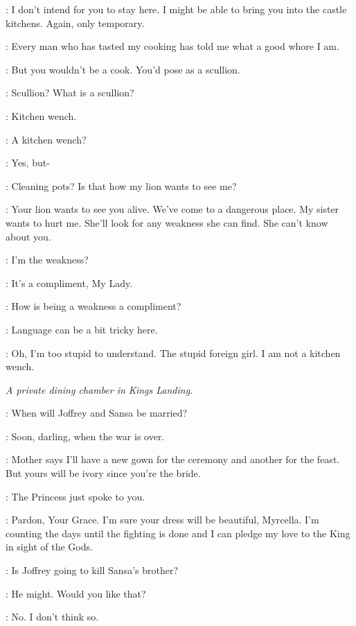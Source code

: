 \TYRION: I don't intend for you to stay here. I might be able to bring you into the castle kitchens. Again, only temporary. 

\SHAE: Every man who has tasted my cooking has told me what a good whore I am. 

\TYRION: But you wouldn't be a cook. You'd pose as a scullion. 

\SHAE: Scullion? What is a scullion? 

\TYRION: Kitchen wench. 

\SHAE: A kitchen wench? 

\TYRION: Yes, but- 

\SHAE: Cleaning pots? Is that how my lion wants to see me? 

\TYRION: Your lion wants to see you alive. We've come to a dangerous place. My sister wants to hurt me. She'll look for any weakness she can find. She can't know about you. 

\SHAE: I'm the weakness? 

\TYRION: It's a compliment, My Lady. 

\SHAE: How is being a weakness a compliment? 

\TYRION: Language can be a bit tricky here. 

\SHAE: Oh, I'm too stupid to understand. The stupid foreign girl. I am not a kitchen wench. 


\scene

\textit{A private dining chamber in Kings Landing.} 


\MYRCELLA: When will Joffrey and Sansa be married? 

\CERSEI: Soon, darling, when the war is over. 

\MYRCELLA: Mother says I'll have a new gown for the ceremony and another for the feast. But yours will be ivory since you're the bride. 

\CERSEI: The Princess just spoke to you. 

\SANSA: Pardon, Your Grace. I'm sure your dress will be beautiful, Myrcella. I'm counting the days until the fighting is done and I can pledge my love to the King in sight of the Gods. 

\TOMMEN: Is Joffrey going to kill Sansa's brother? 

\CERSEI: He might. Would you like that? 

\TOMMEN: No. I don't think so. 

